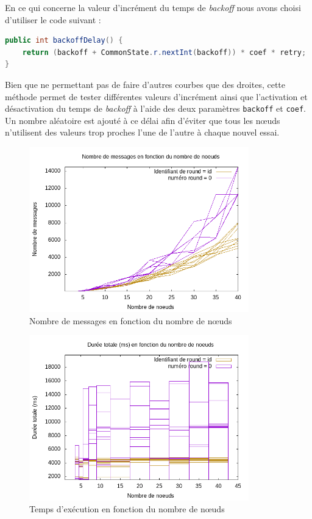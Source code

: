 \documentclass[french]{article}
\begin{document}
En ce qui concerne la valeur d'incrément du temps de \emph{backoff} nous avons choisi d'utiliser le code suivant :

\begin{lstlisting}[language=java]
public int backoffDelay() {
	return (backoff + CommonState.r.nextInt(backoff)) * coef * retry;
}
\end{lstlisting}
Bien que ne permettant pas de faire d'autres courbes que des droites, cette méthode permet de tester différentes valeurs d'incrément ainsi que l'activation et désactivation du temps de \emph{backoff} à l'aide des deux paramètres \lstinline{backoff} et \lstinline{coef}.
Un nombre aléatoire est ajouté à ce délai afin d'éviter que tous les nœuds n'utilisent des valeurs trop proches l'une de l'autre à chaque nouvel essai.

\begin{figure}[hb]
	\centering
	\includegraphics[width=0.85\textwidth]{NoeudsMessages.png} %
	\caption{Nombre de messages en fonction du nombre de nœuds}
	\label{fig:message-node}
\end{figure}


\begin{figure}[ht]
	\centering
	\includegraphics[width=0.85\textwidth]{NoeudDuree.png} %
	\caption{Temps d'exécution en fonction du nombre de nœuds}
	\label{fig:time-node}
\end{figure}
\end{document}
